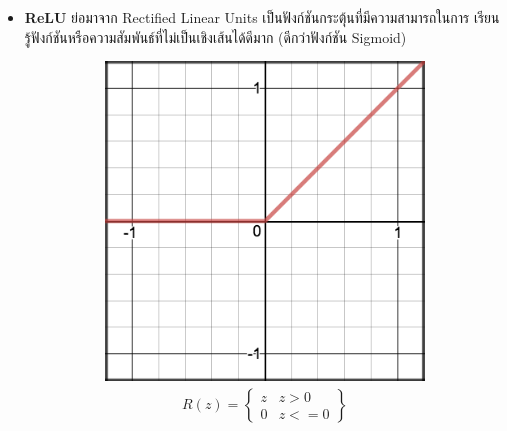 \begin{itemize}
    \item \textbf{ReLU}\autocite{glorot2011} ย่อมาจาก Rectified Linear Units เป็นฟังก์ชันกระตุ้นที่มีความสามารถในการ%
    เรียนรู้ฟังก์ชันหรือความสัมพันธ์ที่ไม่เป็นเชิงเส้นได้ดีมาก (ดีกว่าฟังก์ชัน Sigmoid)
    \begin{figure}[htbp]
        \centering
        \begin{subfigure}{0.5\textwidth}
            \centering
            \includegraphics[width=0.9\linewidth]{fig/actfunc_relu.png}
            \caption{%
                \begin{equation}
                    \begin{split}R(z) = \begin{Bmatrix} z & z > 0 \\
                        0 & z <= 0 \end{Bmatrix}\end{split}
                \end{equation}
            }
            \label{fig:actfunc_relu}
        \end{subfigure}%
        \begin{subfigure}{0.5\textwidth}
            \centering

\end{subfigure}
\end{figure}
\end{itemize}
